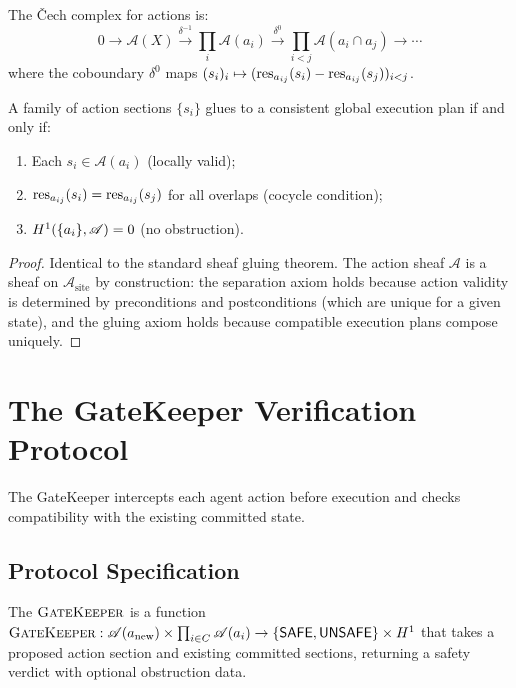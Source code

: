 \documentclass[11pt]{article}
\newcommand{\ActionSite}{\mathcal{A}_{\mathrm{site}}}
\newcommand{\ActionSheaf}{\mathscr{A}}
\newcommand{\GateKeeper}{\textsc{GateKeeper}}
\newcommand{\SafeAction}{\mathsf{SAFE}}
\newcommand{\UnsafeAction}{\mathsf{UNSAFE}}
\begin{document}
The \v{C}ech complex for actions is:
\[
  0 \to \ActionSheaf(X) \xrightarrow{\delta^{-1}}
  \prod_{i} \ActionSheaf(a_i) \xrightarrow{\delta^0}
  \prod_{i < j} \ActionSheaf(a_i \cap a_j) \to \cdots
\]
where the coboundary $\delta^0$ maps
$(s_i)_i \mapsto (\mathrm{res}_{a_{ij}}(s_i) - \mathrm{res}_{a_{ij}}(s_j))_{i<j}$.

\begin{theorem}\label{thm:action-gluing}
A family of action sections $\{s_i\}$ glues to a consistent global
execution plan if and only if:
\begin{enumerate}[label=(\roman*)]
  \item Each $s_i \in \ActionSheaf(a_i)$ (locally valid);
  \item $\mathrm{res}_{a_{ij}}(s_i) = \mathrm{res}_{a_{ij}}(s_j)$ for all overlaps
    (cocycle condition);
  \item $\Hcoh{1}(\{a_i\}, \ActionSheaf) = 0$ (no obstruction).
\end{enumerate}
\end{theorem}

\begin{proof}
Identical to the standard sheaf gluing theorem.  The action sheaf
$\ActionSheaf$ is a sheaf on $\ActionSite$ by construction: the
separation axiom holds because action validity is determined by
preconditions and postconditions (which are unique for a given state),
and the gluing axiom holds because compatible execution plans compose
uniquely.
\end{proof}


\section{The GateKeeper Verification Protocol}\label{sec:verification-protocol}

The GateKeeper intercepts each agent action before execution and checks
compatibility with the existing committed state.

\subsection{Protocol Specification}\label{subsec:protocol}

\begin{definition}[GateKeeper]\label{def:gatekeeper}
The $\GateKeeper$ is a function
$\GateKeeper : \ActionSheaf(a_{\mathrm{new}}) \times
\prod_{i \in C} \ActionSheaf(a_i) \to
\{\SafeAction, \UnsafeAction\} \times \Hcoh{1}$
that takes a proposed action section and existing committed sections,
returning a safety verdict with optional obstruction data.
\end{definition}
\end{document}
